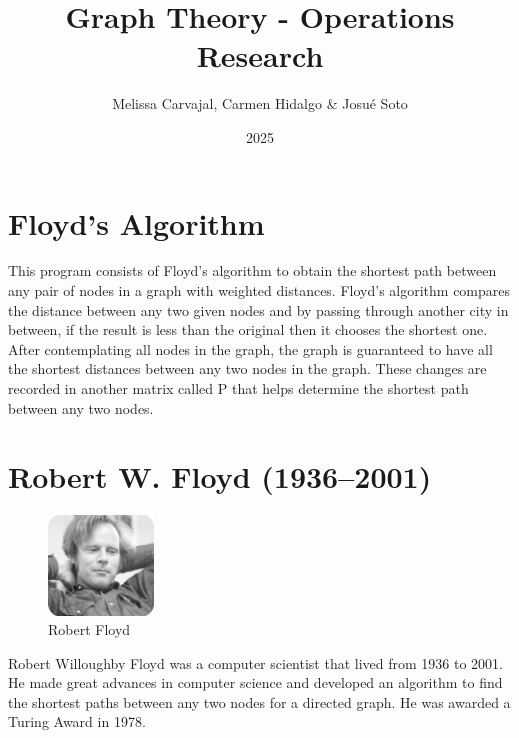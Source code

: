 \documentclass{article}
\begin{document}
\title{Graph Theory - Operations Research}
\author{Melissa Carvajal, Carmen Hidalgo \& Josu\'e Soto}
\date{2025}


\maketitle

\newpage


\section{Floyd's Algorithm}
This program consists of Floyd's algorithm to obtain the shortest path between any pair of nodes in a graph with weighted distances.
Floyd's algorithm compares the distance between any two given nodes and by passing through another city in between, if the result is less than the original then it chooses the shortest one. After contemplating all nodes in the graph, the graph is guaranteed to have all the shortest distances between any two nodes in the graph. These changes are recorded in another matrix called P that helps determine the shortest path between any two nodes.
\section{Robert W. Floyd (1936–2001)}
\begin{figure}
\begin{center}
\includegraphics[width=0.25\textwidth]{floyd.jpg}
\caption{\label{fig:floyd}Robert Floyd}
\end{center}
\end{figure}

Robert Willoughby Floyd was a computer scientist that lived from 1936 to 2001. He made great advances in computer science and developed an algorithm to find the shortest paths between any two nodes for a directed graph. He was awarded a Turing Award in 1978.
\end{document}
